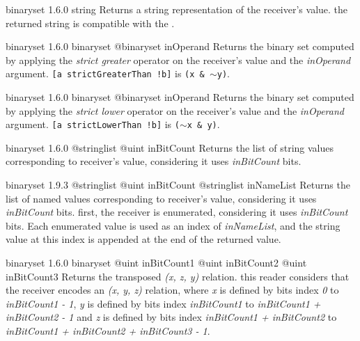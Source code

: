 {binaryset}
{1.6.0}
{string}
{Returns a string representation of the receiver's value.}
{the returned string is compatible with the .}







{binaryset}
{1.6.0}
{binaryset}
{@binaryset inOperand}
{Returns the binary set computed by applying the \emph{strict greater} operator on the receiver's value and the \emph{inOperand} argument.}
{\texttt{[a strictGreaterThan !b]} is \texttt{(x \& $\sim$y)}.}







{binaryset}
{1.6.0}
{binaryset}
{@binaryset inOperand}
{Returns the binary set computed by applying the \emph{strict lower} operator on the receiver's value and the \emph{inOperand} argument.}
{\texttt{[a strictLowerThan !b]} is \texttt{($\sim$x \& y)}.}







{binaryset}
{1.6.0}
{@stringlist}
{@uint inBitCount}
{Returns the list of string values corresponding to receiver's value, considering it uses \emph{inBitCount} bits.}
{}







{binaryset}
{1.9.3}
{@stringlist}
{@uint inBitCount}
{@stringlist inNameList}
{Returns the list of named values corresponding to receiver's value, considering it uses \emph{inBitCount} bits.}
{first, the receiver is enumerated, considering it uses \emph{inBitCount} bits. Each enumerated value is used as an index of \emph{inNameList}, and the string value at this index is appended at the end of the returned value.}







{binaryset}
{1.6.0}
{binaryset}
{@uint inBitCount1}
{@uint inBitCount2}
{@uint inBitCount3}
{Returns the transposed \emph{(x, z, y)} relation.}
{this reader considers that the receiver encodes an \emph{(x, y, z)} relation, where \emph{x} is defined by bits index \emph{0} to \emph{inBitCount1  - 1}, \emph{y} is defined by bits index \emph{inBitCount1} to \emph{inBitCount1 + inBitCount2 - 1} and  \emph{z} is defined by bits index \emph{inBitCount1 + inBitCount2} to \emph{inBitCount1 + inBitCount2 + inBitCount3 - 1}.}







